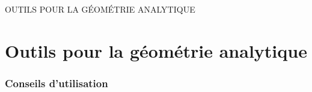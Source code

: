 \documentclass[a4paper,french,11pt]{article}
\begin{document}
%
%
%

\pagebreak

\phantom{t}\par\vfill\par
\begin{PART}
	\begin{center}
		\Huge\MakeUppercase{Outils pour la géométrie analytique}
	\end{center}
\end{PART}
\par\vfill\par\phantom{t}

\newpage

\part{Outils pour la géométrie analytique}

\section{Conseils d'utilisation}
\end{document}
